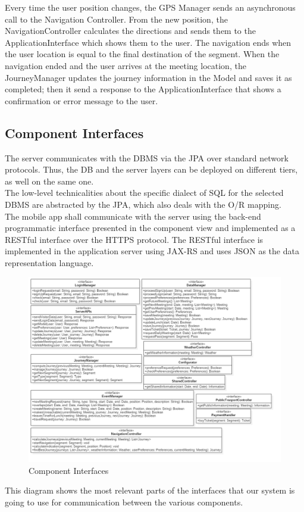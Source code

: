 Every time the user position changes, the GPS Manager sends an asynchronous call to the Navigation Controller.  From the new position, the NavigationController calculates the directions and sends them to the ApplicationInterface which shows them to the user. The navigation ends when the user location is equal to the final destination of the segment.
When the navigation ended and the user arrives at the meeting location, the JourneyManager updates the journey information in the Model and saves it as completed; then it send a response to the ApplicationInterface that shows a confirmation or error message to the user.


\clearpage
\subsection{Component Interfaces}
The server communicates with the DBMS via the JPA over standard network protocols. Thus, the DB and the server layers can be deployed on different tiers, as well on the same one.\\
The low-level technicalities about the specific dialect of SQL for the selected DBMS are abstracted by the JPA, which also deals with the O/R mapping.\\
The mobile app shall communicate with the server using the back-end programmatic interface presented in the component view and implemented as a RESTful interface over the HTTPS protocol. The RESTful interface is implemented in the application server using JAX-RS and uses JSON as the data representation language.
\\
\begin{figure}[H]
\centering
\includegraphics[scale=0.4]{images/componentInterfaces}
\caption{Component Interfaces}
\end{figure}
This diagram shows the most relevant parts of the interfaces that our system is going to use for communication between the various components.

